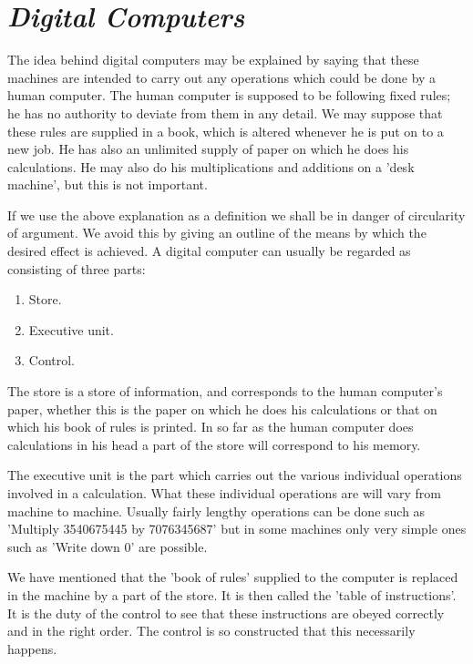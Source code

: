    \section{\textit{Digital Computers}}
    
    The idea behind digital computers may be explained by saying that these machines are intended to carry out any operations which could be done by a human computer. The human computer is supposed to be following fixed rules; he has no authority to deviate from them in any detail. We may suppose that these rules are supplied in a book, which is altered whenever he is put on to a new job. He has also an unlimited supply of paper on which he does his calculations. He may also do his multiplications and additions on a 'desk machine', but this is not important.

    If we use the above explanation as a definition we shall be in danger of circularity of argument. We avoid this by giving an outline of the means by which the desired effect is achieved. A digital computer can usually be regarded as consisting of three parts:
    \vspace{\baselineskip}

    \begin{enumerate}[label=(\roman*)]
        \item{Store.}
        \item{Executive unit.}
        \item{Control.}
    \end{enumerate}

    The store is a store of information, and corresponds to the human computer's paper, whether this is the paper on which he does his calculations or that on which his book of rules is printed. In so far as the human computer does calculations in his head a part of the store will correspond to his memory.

    The executive unit is the part which carries out the various individual operations involved in a calculation. What these individual operations are will vary from machine to machine. Usually fairly lengthy operations can be done such as 'Multiply 3540675445 by 7076345687' but in some machines only very simple ones such as 'Write down 0' are possible.

    We have mentioned that the 'book of rules' supplied to the computer is replaced in the machine by a part of the store. It is then called the 'table of instructions'. It is the duty of the control to see that these instructions are obeyed correctly and in the right order. The control is so constructed that this necessarily happens.

